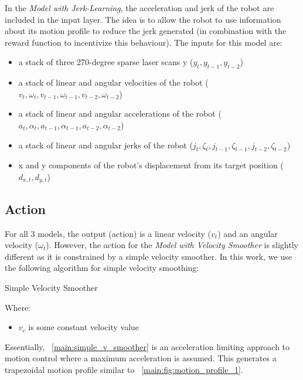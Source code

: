 In the \textit{Model with Jerk-Learning}, the acceleration and jerk of the robot are included in the input layer. The idea is to allow the robot to use information about its motion profile to reduce the jerk generated (in combination with the reward function to incentivize this behaviour). The inputs for this model are:
\begin{itemize}
\item a stack of three 270-degree sparse laser scans y ($y_{t}, y_{t-1}, y_{t-2}$)
\item a stack of linear and angular velocities of the robot ($v_{t}, \omega_{t}, v_{t-1}, \omega_{t-1}, v_{t-2}, \omega_{t-2}$)
\item a stack of linear and angular accelerations of the robot ($a_{t}, \alpha_{t}, a_{t-1}, \alpha_{t-1}, a_{t-2}, \alpha_{t-2}$)
\item a stack of linear and angular jerks of the robot ($j_{t}, \zeta_{t}, j_{t-1}, \zeta_{t-1}, j_{t-2}, \zeta_{t-2}$)
\item x and y components of the robot's displacement from its target position ($d_{x,t}, d_{y,t}$)
\end{itemize}

\subsection{Action}
For all 3 models, the output (action) is a linear velocity ($v_t$) and an angular velocity ($\omega_{t}$). However, the action for the \textit{Model with Velocity Smoother} is slightly different as it is constrained by a simple velocity smoother. In this work, we use the following algorithm for simple velocity smoothing:

\begin{algorithm}
\caption{Simple Velocity Smoother}
\label{main:simple_v_smoother}
\end{algorithm}
Where:
\begin{itemize}
\item $v_c$ is some constant velocity value
\end{itemize}

Essentially, ~\autoref{main:simple_v_smoother} is an acceleration limiting approach to motion control where a maximum acceleration is assumed. This generates a trapezoidal motion profile similar to ~\autoref{main:fig:motion_profile_1}. 


